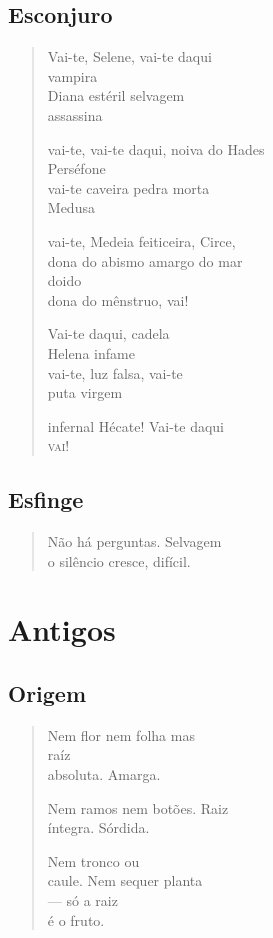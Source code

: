 \chapter{Esconjuro}

\begin{verse}
Vai-te, Selene, vai-te daqui\\
vampira\\
Diana estéril selvagem\\
assassina

vai-te, vai-te daqui, noiva do Hades\\
Perséfone\\
vai-te caveira pedra morta\\
Medusa

vai-te, Medeia feiticeira, Circe,\\
dona do abismo amargo do mar\\
doido\\
dona do mênstruo, vai!

Vai-te daqui, cadela\\
Helena infame\\
vai-te, luz falsa, vai-te\\
puta virgem

infernal Hécate! Vai-te daqui\\
\textsc{vai}!
\end{verse}

\chapter{Esfinge}

\begin{verse}
Não há perguntas. Selvagem\\
o silêncio cresce, difícil.
\end{verse}

\part*{Antigos}

\chapter{Origem}

\begin{verse}
Nem flor nem folha mas\\
raíz\\
absoluta. Amarga.

\qquad Nem ramos nem botões. Raiz\\
\qquad\quad íntegra. Sórdida.

\qquad\quad Nem tronco ou\\
\qquad\quad caule. Nem sequer planta\\
\qquad\quad --- só a raiz\\
\qquad\quad\quad é o fruto.
\end{verse}

